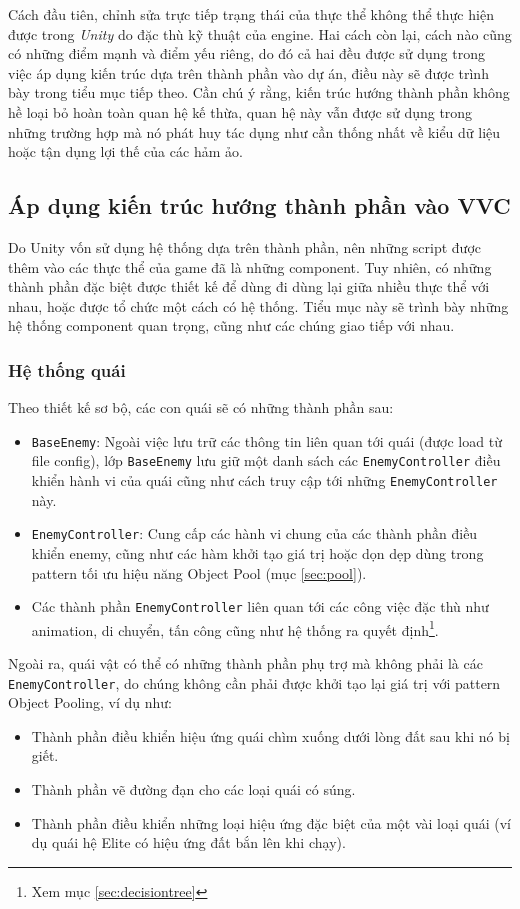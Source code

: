 \documentclass[12pt]{report}
\newcommand{\project}{VVC }
\begin{document}
Cách đầu tiên, chỉnh sửa trực tiếp trạng thái của thực thể không thể thực hiện được trong \textit{Unity} do đặc thù kỹ thuật của engine. Hai cách còn lại, cách nào cũng có những điểm mạnh và điểm yếu riêng, do đó cả hai đều được sử dụng trong việc áp dụng kiến trúc dựa trên thành phần vào dự án, điều này sẽ được trình bày trong tiểu mục tiếp theo. Cần chú ý rằng, kiến trúc hướng thành phần không hề loại bỏ hoàn toàn quan hệ kế thừa, quan hệ này vẫn được sử dụng trong những trường hợp mà nó phát huy tác dụng như cần thống nhất về kiểu dữ liệu hoặc tận dụng lợi thế của các hảm ảo.

\subsection{Áp dụng kiến trúc hướng thành phần vào \project}
Do Unity vốn sử dụng hệ thống dựa trên thành phần, nên những script được thêm vào các thực thể của game đã là những component. Tuy nhiên, có những thành phần đặc biệt được thiết kế để dùng đi dùng lại giữa nhiều thực thể với nhau, hoặc được tổ chức một cách có hệ thống. Tiểu mục này sẽ trình bày những hệ thống component quan trọng, cũng như các chúng giao tiếp với nhau.

\subsubsection{Hệ thống quái}
Theo thiết kế sơ bộ, các con quái sẽ có những thành phần sau:
\begin{itemize}
	\item \texttt{BaseEnemy}: Ngoài việc lưu trữ các thông tin liên quan tới quái (được load từ file config), lớp \texttt{BaseEnemy} lưu giữ một danh sách các \texttt{EnemyController} điều khiển hành vi của quái cũng như cách truy cập tới những \texttt{EnemyController} này.
	\item \texttt{EnemyController}: Cung cấp các hành vi chung của các thành phần điều khiển enemy, cũng như các hàm khởi tạo giá trị hoặc dọn dẹp dùng trong pattern tối ưu hiệu năng Object Pool (mục \ref{sec:pool}).
	\item Các thành phần \texttt{EnemyController} liên quan tới các công việc đặc thù như animation, di chuyển, tấn công cũng như hệ thống ra quyết định\footnote{Xem mục \ref{sec:decisiontree}}.
\end{itemize}

Ngoài ra, quái vật có thể có những thành phần phụ trợ mà không phải là các \texttt{EnemyController}, do chúng không cần phải được khởi tạo lại giá trị với pattern Object Pooling, ví dụ như:
\begin{itemize}
	\item Thành phần điều khiển hiệu ứng quái chìm xuống dưới lòng đất sau khi nó bị giết.
	\item Thành phần vẽ đường đạn cho các loại quái có súng.
	\item Thành phần điều khiển những loại hiệu ứng đặc biệt của một vài loại quái (ví dụ quái hệ Elite có hiệu ứng đất bắn lên khi chạy).
\end{itemize}
\end{document}
